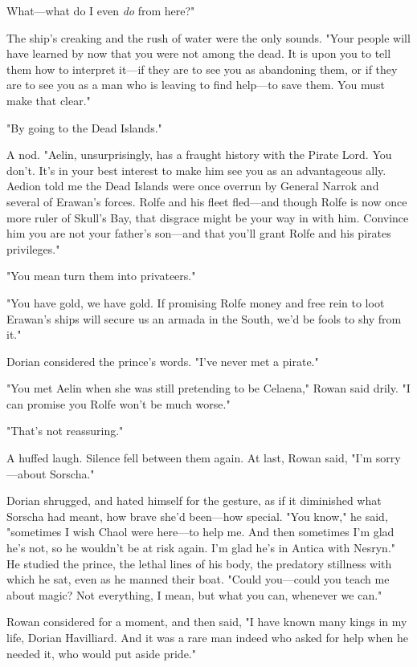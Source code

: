 What---what do I even \emph{do} from here?"

The ship's creaking and the rush of water were the only sounds. "Your people will have learned by now that you were not among the dead. It is upon you to tell them how to interpret it---if they are to see you as abandoning them, or if they are to see you as a man who is leaving to find help---to save them. You must make that clear."

"By going to the Dead Islands."

A nod. "Aelin, unsurprisingly, has a fraught history with the Pirate Lord. You don't. It's in your best interest to make him see you as an advantageous ally. Aedion told me the Dead Islands were once overrun by General Narrok and several of Erawan's forces. Rolfe and his fleet fled---and though Rolfe is now once more ruler of Skull's Bay, that disgrace might be your way in with him. Convince him you are not your father's son---and that you'll grant Rolfe and his pirates privileges."

"You mean turn them into privateers."

"You have gold, we have gold. If promising Rolfe money and free rein to loot Erawan's ships will secure us an armada in the South, we'd be fools to shy from it."

Dorian considered the prince's words. "I've never met a pirate."

"You met Aelin when she was still pretending to be Celaena," Rowan said drily. "I can promise you Rolfe won't be much worse."

"That's not reassuring."

A huffed laugh. Silence fell between them again. At last, Rowan said, "I'm sorry---about Sorscha."

Dorian shrugged, and hated himself for the gesture, as if it diminished what Sorscha had meant, how brave she'd been---how special. "You know," he said, "sometimes I wish Chaol were here---to help me. And then sometimes I'm glad he's not, so he wouldn't be at risk again. I'm glad he's in Antica with Nesryn." He studied the prince, the lethal lines of his body, the predatory stillness with which he sat, even as he manned their boat. "Could you---could you teach me about magic? Not everything, I mean, but  what you can, whenever we can."

Rowan considered for a moment, and then said, "I have known many kings in my life, Dorian Havilliard. And it was a rare man indeed who asked for help when he needed it, who would put aside pride."

